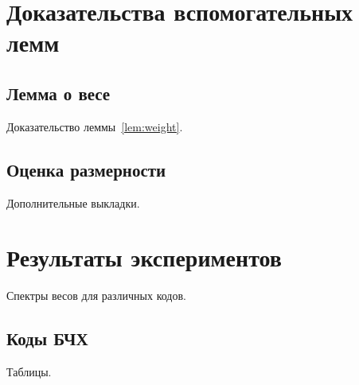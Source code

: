 \documentclass[font=modern]{cmcmsuthesis-phd}
\begin{document}
\appendix
\chapter{Доказательства вспомогательных лемм}
\section{Лемма о весе}
Доказательство леммы~\ref{lem:weight}.
\section{Оценка размерности}
Дополнительные выкладки.

\chapter{Результаты экспериментов}
Спектры весов для различных кодов.
\section{Коды БЧХ}
Таблицы.
\end{document}
